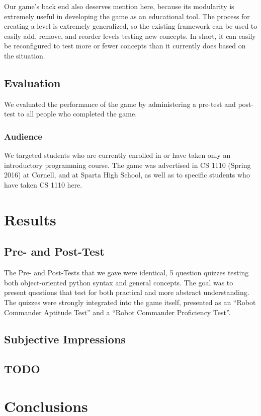 \documentclass[12pt,notitlepage]{article}
\begin{document}
Our game's back end also deserves mention here, because its modularity is
extremely useful in developing the game as an educational tool. The process for
creating a level is extremely generalized, so the existing framework can
be used to easily add, remove, and reorder levels testing new concepts.
In short, it can easily be reconfigured to test more or fewer concepts than
it currently does based on the situation.

\subsection{Evaluation}

We evaluated the performance of the game by administering a pre-test
and post-test to all people who completed the game.

\subsubsection{Audience}

We targeted students who are currently enrolled in or have taken only
an introductory programming course. The game was advertised in CS 1110
(Spring 2016) at Cornell, and at Sparta High School, as well as
to specific students who have taken CS 1110 here.

\section{Results}

\subsection{Pre- and Post-Test}

The Pre- and Post-Tests that we gave were identical, 5 question quizzes
testing both object-oriented python syntax and general concepts. The goal
was to present questions that test for both practical and more abstract
understanding. The quizzes were strongly integrated into the game itself,
presented as an ``Robot Commander Aptitude Test'' and a ``Robot Commander
Proficiency Test''.

\subsection{Subjective Impressions}

\subsection{TODO}

\section{Conclusions}
\end{document}
